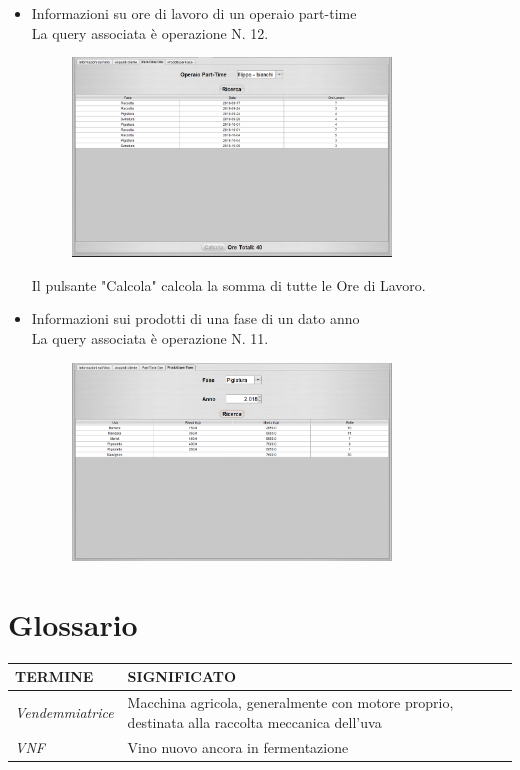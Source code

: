 \documentclass{article}
\begin{document}
\begin{itemize}
\newpage
\item Informazioni su ore di lavoro di un operaio part-time\\
La query associata è operazione N. 12.\\
\begin{figure}[htbp]
\centering
\includegraphics[width=0.8\textwidth]{img/panel_part_ore.png}
\end{figure}\newline
Il pulsante "Calcola" calcola la somma di tutte le Ore di Lavoro.\\
\item Informazioni sui prodotti di una fase di un dato anno \\
La query associata è operazione N. 11.\\
\begin{figure}[htbp]
\centering
\includegraphics[width=0.8\textwidth]{img/panel_info_prodotti.png}
\end{figure}
\end{itemize}
\newpage
\section{Glossario}

\begin{tabular}{lp{} lp{} }\hline
     \textbf{TERMINE} & \textbf{SIGNIFICATO} \\\hline
     \textit{Vendemmiatrice} & Macchina agricola, generalmente con motore proprio, destinata alla raccolta meccanica dell'uva  \\ \hline
     \textit{VNF} & Vino nuovo ancora in fermentazione  
\end{tabular}
\end{document}
